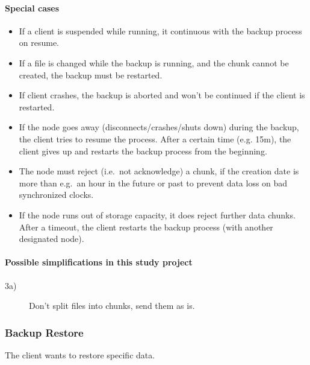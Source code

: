 \paragraph{Special cases}
\begin{itemize}
    \item If a client is suspended while running, it continuous with the backup process on resume. %
    \item If a file is changed while the backup is running, and the chunk cannot be created, the backup must be restarted. %
    \item If client crashes, the backup is aborted and won't be continued if the client is restarted.
    \item If the node goes away (disconnects/crashes/shuts down) during the backup, the client tries to resume the process. After a certain time (e.g. 15m), the client gives up and restarts the backup process from the beginning.
    \item The node must reject (i.e.\ not acknowledge) a chunk, if the creation date is more than e.g.\ an hour in the future or past to prevent data loss on bad synchronized clocks.
    \item If the node runs out of storage capacity, it does reject further data chunks. After a timeout, the client restarts the backup process (with another designated node).
\end{itemize}

\paragraph{Possible simplifications in this study project}
\begin{description}
    \item[3a)] Don't split files into chunks, send them as is.
\end{description}

\subsubsection{Backup Restore}\label{sec:scenario-backup-restore}
The client wants to restore specific data.

